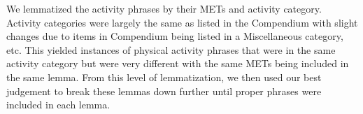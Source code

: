 We lemmatized the activity phrases by their METs and activity
category.  Activity categories were largely the same as listed in the
Compendium with slight changes due to items in Compendium being listed
in a Miscellaneous category, etc. This yielded instances of physical
activity phrases that were in the same activity category but were very
different with the same METs being included in the same lemma.  From
this level of lemmatization, we then used our best judgement to break
these lemmas down further until proper phrases were included in each
lemma.
